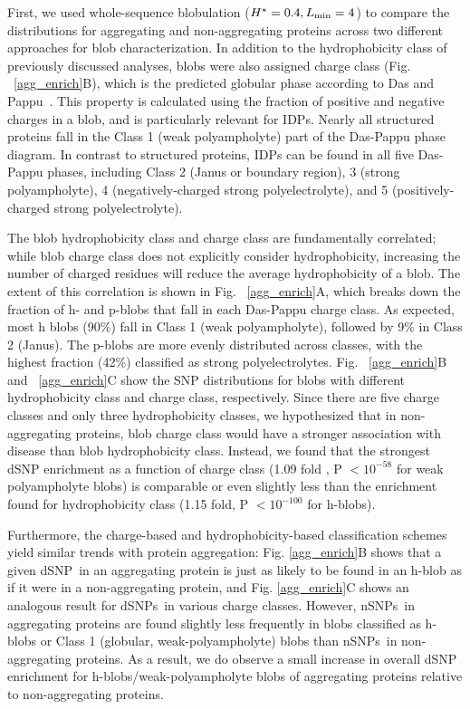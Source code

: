 \documentclass[9pt,twocolumn,twoside,lineno]{pnas-new}
\newcommand{\inserted}[1]{{#1}}
\newcommand{\dSNPs}{dSNPs~}
\newcommand{\nSNPs}{nSNPs~}
\newcommand{\dSNP}{dSNP~}
\newcommand{\hydrochar}{hydrophobicity class}
\newcommand{\chargechar}{charge class}
\newcommand{\Ht}{H^{\star}}
\newcommand{\Lmin}{L_{\rm min}}
\begin{document}
First, we used whole-sequence blobulation ($\Ht=0.4, \Lmin=4$) to compare the distributions for aggregating and non-aggregating proteins across two different approaches for blob characterization. In addition to the \hydrochar{} of previously discussed analyses, blobs were also assigned \chargechar{} (Fig. ~\ref{agg_enrich}B), which is the predicted globular phase according to Das and Pappu~\citep{Das2013}. This property is calculated using the fraction of positive and negative charges in a blob, and is particularly relevant for IDPs. 
Nearly all structured proteins fall in the Class 1 (weak polyampholyte) part of the Das-Pappu phase diagram. In contrast to structured proteins, IDPs can be found in all five Das-Pappu phases, including Class 2 (Janus or boundary region), 3 (strong polyampholyte), 4 (negatively-charged strong polyelectrolyte), and 5 (positively-charged strong polyelectrolyte). 

The blob \hydrochar{} and \chargechar{} are fundamentally correlated; while blob \chargechar{} does not explicitly consider hydrophobicity, increasing the number of charged residues will reduce the average hydrophobicity of a blob. The extent of this correlation is shown in  Fig. ~\ref{agg_enrich}A, which breaks down the fraction of h- and p-blobs that fall in each Das-Pappu \chargechar. As expected, most h blobs (90\%) fall in Class 1 (weak polyampholyte), followed by 9\% in Class 2 (Janus).  The p-blobs are more evenly distributed across classes, with the highest fraction (42\%) classified as strong polyelectrolytes.  Fig. ~\ref{agg_enrich}B and ~\ref{agg_enrich}C show the SNP distributions for blobs with different \hydrochar{} and \chargechar, respectively. Since there are five charge classes and only three hydrophobicity classes, we hypothesized that in non-aggregating proteins, blob \chargechar{} would have a stronger association with disease than blob \hydrochar{}. Instead, we found that the strongest dSNP enrichment as a function of \chargechar{} (1.09 fold , \inserted{P $< 10^{-58}$} for weak polyampholyte blobs) is comparable or even slightly less than the enrichment found for \hydrochar{} (\inserted{1.15 fold, P $< 10^{-100}$} for h-blobs). 

Furthermore, the charge-based and hydrophobicity-based classification schemes yield similar trends with protein aggregation:  Fig. \ref{agg_enrich}B shows that a given \dSNP in an aggregating protein is just as likely to be found in an h-blob as if it were in a non-aggregating protein, and Fig. \ref{agg_enrich}C shows an analogous result for \dSNPs in various charge classes. However, \nSNPs in aggregating proteins are found slightly less frequently in blobs classified as h-blobs or Class 1 (globular, weak-polyampholyte) blobs than \nSNPs in non-aggregating proteins. As a result, we do observe a small increase in overall dSNP enrichment for h-blobs/weak-polyampholyte blobs of aggregating proteins relative to non-aggregating proteins.
\end{document}
